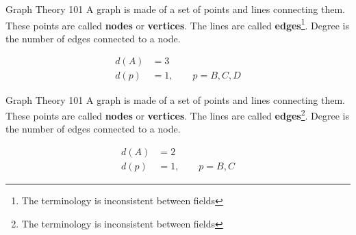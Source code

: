 \documentclass[mathserif]{beamer}
\begin{document}
\begin{frame}{Graph Theory 101}
    A graph is made of a set of  points and lines connecting them. These 
points are called \textbf{nodes} or \textbf{vertices}. The lines are called
\textbf{edges}\footnote{The terminology is inconsistent between fields}.
Degree is the number of edges connected to a node. 
\centering \vskip5mm

\pause

\begin{align*}
    d(A) &= 3 \\
    d(p) &= 1, \qquad p = B, C, D
\end{align*} 

\end{frame}

\begin{frame}{Graph Theory 101}
    A graph is made of a set of  points and lines connecting them. These 
points are called \textbf{nodes} or \textbf{vertices}. The lines are called
\textbf{edges}\footnote{The terminology is inconsistent between fields}.
Degree is the number of edges connected to a node. 
    \centering
    \vskip5mm
    \begin{align*}
    d(A) &= 2 \\
    d(p) &= 1, \qquad p = B, C
\end{align*} 
\end{frame}
\end{document}
